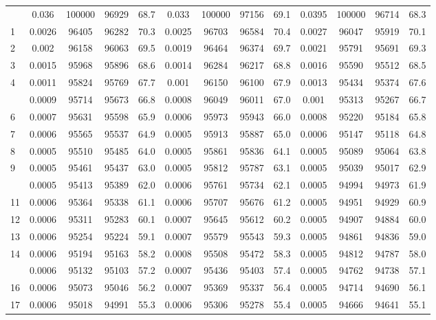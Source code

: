 \documentclass[
  14pt,
]{article}
\begin{document}
\begin{longtable}[t]{lcccccccccccc}
\endfoot
\bottomrule
\endlastfoot
0 & 0.036 & 100000 & 96929 & 68.7 & 0.033 & 100000 & 97156 & 69.1 & 0.0395 & 100000 & 96714 & 68.3\\
1 & 0.0026 & 96405 & 96282 & 70.3 & 0.0025 & 96703 & 96584 & 70.4 & 0.0027 & 96047 & 95919 & 70.1\\
2 & 0.002 & 96158 & 96063 & 69.5 & 0.0019 & 96464 & 96374 & 69.7 & 0.0021 & 95791 & 95691 & 69.3\\
3 & 0.0015 & 95968 & 95896 & 68.6 & 0.0014 & 96284 & 96217 & 68.8 & 0.0016 & 95590 & 95512 & 68.5\\
4 & 0.0011 & 95824 & 95769 & 67.7 & 0.001 & 96150 & 96100 & 67.9 & 0.0013 & 95434 & 95374 & 67.6\\
\addlinespace
5 & 0.0009 & 95714 & 95673 & 66.8 & 0.0008 & 96049 & 96011 & 67.0 & 0.001 & 95313 & 95267 & 66.7\\
6 & 0.0007 & 95631 & 95598 & 65.9 & 0.0006 & 95973 & 95943 & 66.0 & 0.0008 & 95220 & 95184 & 65.8\\
7 & 0.0006 & 95565 & 95537 & 64.9 & 0.0005 & 95913 & 95887 & 65.0 & 0.0006 & 95147 & 95118 & 64.8\\
8 & 0.0005 & 95510 & 95485 & 64.0 & 0.0005 & 95861 & 95836 & 64.1 & 0.0005 & 95089 & 95064 & 63.8\\
9 & 0.0005 & 95461 & 95437 & 63.0 & 0.0005 & 95812 & 95787 & 63.1 & 0.0005 & 95039 & 95017 & 62.9\\
\addlinespace
10 & 0.0005 & 95413 & 95389 & 62.0 & 0.0006 & 95761 & 95734 & 62.1 & 0.0005 & 94994 & 94973 & 61.9\\
11 & 0.0006 & 95364 & 95338 & 61.1 & 0.0006 & 95707 & 95676 & 61.2 & 0.0005 & 94951 & 94929 & 60.9\\
12 & 0.0006 & 95311 & 95283 & 60.1 & 0.0007 & 95645 & 95612 & 60.2 & 0.0005 & 94907 & 94884 & 60.0\\
13 & 0.0006 & 95254 & 95224 & 59.1 & 0.0007 & 95579 & 95543 & 59.3 & 0.0005 & 94861 & 94836 & 59.0\\
14 & 0.0006 & 95194 & 95163 & 58.2 & 0.0008 & 95508 & 95472 & 58.3 & 0.0005 & 94812 & 94787 & 58.0\\
\addlinespace
15 & 0.0006 & 95132 & 95103 & 57.2 & 0.0007 & 95436 & 95403 & 57.4 & 0.0005 & 94762 & 94738 & 57.1\\
16 & 0.0006 & 95073 & 95046 & 56.2 & 0.0007 & 95369 & 95337 & 56.4 & 0.0005 & 94714 & 94690 & 56.1\\
17 & 0.0006 & 95018 & 94991 & 55.3 & 0.0006 & 95306 & 95278 & 55.4 & 0.0005 & 94666 & 94641 & 55.1\\

\end{longtable}
\end{document}
